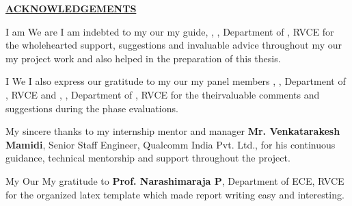 \thispagestyle{empty}
\ifIDP \vspace{-1cm}\fi
\begin{center}
	\Large\textbf{\underline{ACKNOWLEDGEMENTS}} \par
\end{center}

\ifPG I am \else
\ifStuNameBUsed We are \else I am \fi\fi indebted to \ifPG my \else\ifStuNameBUsed our \else my \fi\fi guide, \textbf{\printGuideNameA}, \printGuideDesigA, Department of \printGuideDeptAInSF, RVCE for the wholehearted support, suggestions and invaluable advice throughout \ifPG my \else\ifStuNameBUsed our \else my \fi\fi project work and also helped in the preparation of this thesis.\\ \par

\ifPG I \else \ifStuNameBUsed We \else I \fi\fi also express our gratitude to \ifPG my \else\ifStuNameBUsed our \else my \fi\fi  panel member\ifIDP\space\else s \fi\textbf{\printPanelMemberA}, \printPanelMemberDesigA, Department of \printPanelMemberDeptAInSF, RVCE \ifIDP \else and \textbf{\printPanelMemberB}, \printPanelMemberDesigB , Department of \printPanelMemberDeptBInSF, RVCE \fi for \ifPanelMemBUsed the \else their\fi valuable comments and suggestions during the phase evaluations. \\ \par

My sincere thanks to my internship mentor and manager \textbf{Mr. Venkatarakesh Mamidi}, Senior Staff Engineer, Qualcomm India Pvt. Ltd., for his continuous guidance, technical mentorship and support throughout the project.\\ \par

\ifPG My \else \ifStuNameBUsed Our \else My \fi\fi gratitude to \textbf{Prof. Narashimaraja P}, Department of ECE, RVCE for the organized latex template which made report writing easy and interesting.\\ \par


